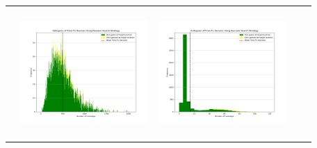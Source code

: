 \begin{landscape}
\begin{table}[h!]
\begin{tabular}{ | c | c | c | c | c |}
\begin{minipage}[c][49mm][c]{49mm}
    \end{minipage}
    &
    \begin{minipage}[c][49mm][c]{49mm}
      \includegraphics[width=49mm, height=49mm]{Chapters/MultiAgentTargetDetection/Figs/Histograms/VaryingPrior/Gaussian/GaussianRandomHistogram.png}
    \end{minipage}
    &
    \begin{minipage}[c][49mm][c]{49mm}
      \includegraphics[width=49mm, height=49mm]{Chapters/MultiAgentTargetDetection/Figs/Histograms/VaryingPrior/Gaussian/GaussianSaccadicHistogram.png}
    \end{minipage}
    \\


\end{tabular}
\end{table}
\end{landscape}
